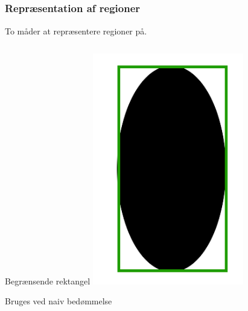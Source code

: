 \documentclass[xcolor=table]{beamer}
\begin{document}
\subsection*{}
\begin{frame}

    \frametitle{Repræsentation af regioner}

    To måder at repræsentere regioner på.

    \begin{columns}[t]
        \begin{exampleblock}{Begrænsende rektangel}
            \centering
            \includegraphics[width=0.6\textwidth]{billeder/blob_bbox}

            Bruges ved naiv bedømmelse
        \end{exampleblock}


\end{columns}
\end{frame}
\end{document}
